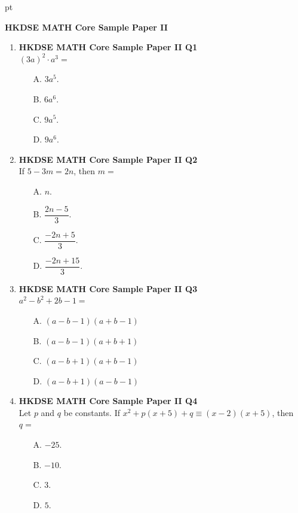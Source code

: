 \documentclass[12pt]{article}
\begin{document}
 pt
\begin{center}
	{\large \bf HKDSE MATH Core Sample Paper II}\\
	\vspace{2 mm}
\end{center}
\vspace{0.05cm}

\begin{enumerate}
	\item \textbf{HKDSE MATH Core Sample Paper II Q1}\\
	$(3a)^2 \cdot a^3 = $
	\begin{enumerate}
		\item[A.] $3a^5$.
		\item[B.] $6a^6$.
		\item[C.] $9a^5$.
		\item[D.] $9a^6$.
	\end{enumerate}

	\item \textbf{HKDSE MATH Core Sample Paper II Q2}\\
	If $5 - 3m = 2n$, then $m =$
	\begin{enumerate}
		\item[A.] $n$.
		\item[B.] $\dfrac{2n - 5}{3}$.
		\item[C.] $\dfrac{-2n + 5}{3}$.
		\item[D.] $\dfrac{-2n + 15}{3}$.
	\end{enumerate}

	\item \textbf{HKDSE MATH Core Sample Paper II Q3}\\
	$a^2 - b^2 + 2b - 1 =$
	\begin{enumerate}
		\item[A.] $(a - b - 1)(a + b - 1)$
		\item[B.] $(a - b - 1)(a + b + 1)$
		\item[C.] $(a - b + 1)(a + b - 1)$
		\item[D.] $(a - b + 1)(a - b - 1)$
	\end{enumerate}

	\item \textbf{HKDSE MATH Core Sample Paper II Q4}\\
	Let $p$ and $q$ be constants. If $x^2 + p(x + 5) + q \equiv (x - 2)(x + 5)$, then $q = $
	\begin{enumerate}
		\item[A.] $-25$.
		\item[B.] $-10$.
		\item[C.] $3$.
		\item[D.] $5$.
	\end{enumerate}


\end{enumerate}
\end{document}
